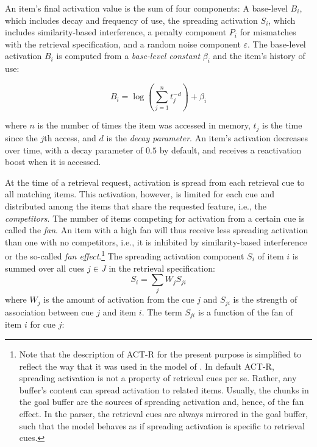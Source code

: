 \documentclass{cambridge7A}\usepackage[]{graphicx}\usepackage[]{color}
\begin{document}
An item's final activation value is the sum of four components: A base-level $B_i$, which includes decay and frequency of use, the spreading activation $S_i$, which includes similarity-based interference, a penalty component $P_i$ for mismatches with the retrieval specification, and a random noise component $\varepsilon$. The base-level activation $B_i$ is computed from a \textit{base-level constant} $\beta_i$ and the item's history of use:

\begin{equation}\label{eq:base}
	B_i = \log\left (\sum_{j=1}^n t_j^{-d}\right) + \beta_i
\end{equation}

\noindent
where $n$ is the number of times the item was accessed in memory, $t_j$ is the time since the $j$th access, and $d$ is the  \textit{decay parameter}. An item's activation decreases over time, with a decay parameter of $0.5$ by default, and receives a reactivation boost when it is accessed. 

At the time of a retrieval request, activation is spread from each retrieval cue to all matching items. This activation, however, is limited for each cue and distributed among the items that share the requested feature, i.e., the \emph{competitors}. The number of items competing for activation from a certain cue is called the \textit{fan}. An item with a high fan will thus receive less spreading activation than one with no competitors, i.e., it is inhibited by similarity-based interference or the so-called  \textit{fan effect}.\footnote{Note that the description of ACT-R for the present purpose is simplified to reflect the way that it was used in the model of \cite{LewisVasishth2005}. In default ACT-R, spreading activation is not a property of retrieval cues per se. Rather, any buffer's content can spread activation to related items. Usually, the chunks in the goal buffer are the sources of spreading activation and, hence, of the fan effect. In the \cite{LewisVasishth2005} parser, the retrieval cues are always mirrored in the goal buffer, such that the model behaves as if spreading activation is specific to retrieval cues.}
The spreading activation component $S_i$ of item $i$ is summed over all cues $j \in J$ in the retrieval specification: 
\begin{equation}\label{eq:spread}
	S_i = \sum_j W_{j} S_{ji}
\end{equation}
where $W_{j}$ is the amount of activation from the cue $j$ and $S_{ji}$ is the strength of association between cue $j$ and item $i$. The term $S_{ji}$ is a function of the fan of item $i$ for cue $j$:
\end{document}
